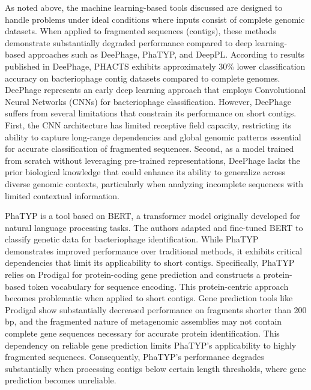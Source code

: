 \documentclass[runningheads]{llncs}
\begin{document}
As noted above, the machine learning-based tools discussed are designed to handle problems under ideal conditions where inputs consist of complete genomic datasets. When applied to fragmented sequences (contigs), these methods demonstrate substantially degraded performance compared to deep learning-based approaches such as DeePhage\cite{wu2021deephage}, PhaTYP\cite{shang2023phatyp}, and DeepPL\cite{zhang2024deeppl}. According to results published in DeePhage\cite{wu2021deephage}, PHACTS\cite{mcnair2012phacts} exhibits approximately 30\% lower classification accuracy on bacteriophage contig datasets compared to complete genomes. DeePhage\cite{wu2021deephage} represents an early deep learning approach that employs Convolutional Neural Networks (CNNs) for bacteriophage classification. However, DeePhage suffers from several limitations that constrain its performance on short contigs. First, the CNN architecture has limited receptive field capacity, restricting its ability to capture long-range dependencies and global genomic patterns essential for accurate classification of fragmented sequences\cite{wu2021deephage}. Second, as a model trained from scratch without leveraging pre-trained representations, DeePhage lacks the prior biological knowledge that could enhance its ability to generalize across diverse genomic contexts, particularly when analyzing incomplete sequences with limited contextual information.

PhaTYP\cite{shang2023phatyp} is a tool based on BERT\cite{devlin2019bert}, a transformer model originally developed for natural language processing tasks. The authors adapted and fine-tuned BERT to classify genetic data for bacteriophage identification. While PhaTYP demonstrates improved performance over traditional methods, it exhibits critical dependencies that limit its applicability to short contigs. Specifically, PhaTYP relies on Prodigal\cite{hyatt2010prodigal} for protein-coding gene prediction and constructs a protein-based token vocabulary for sequence encoding. This protein-centric approach becomes problematic when applied to short contigs. Gene prediction tools like Prodigal show substantially decreased performance on fragments shorter than 200 bp\cite{trimble2012short}, and the fragmented nature of metagenomic assemblies may not contain complete gene sequences necessary for accurate protein identification\cite{shang2023phatyp}. This dependency on reliable gene prediction limits PhaTYP's applicability to highly fragmented sequences. Consequently, PhaTYP's performance degrades substantially when processing contigs below certain length thresholds, where gene prediction becomes unreliable.
\end{document}
